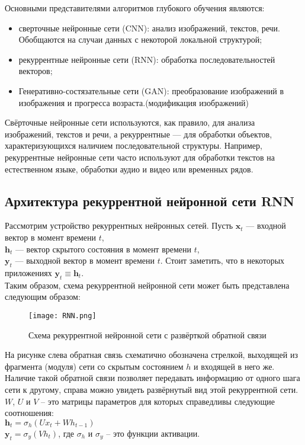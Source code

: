 \documentclass{article}
\begin{document}
	
	Основными представителями алгоритмов глубокого обучения являются:
	\begin{itemize}
		    \item сверточные нейронные сети (CNN): анализ изображений, текстов,
речи. Обобщаются на случаи данных с некоторой локальной
структурой;
    \item рекуррентные нейронные сети (RNN): обработка последовательностей
векторов;
\item Генеративно-состязательные сети (GAN): преобразование изображений в изображения и прогресса возраста.(модификация изображений)
	\end{itemize}
	
	Свёрточные нейронные сети используются, как правило, для анализа изображений, текстов и речи, а рекуррентные --- для обработки объектов, характеризующихся наличием последовательной структуры. Например, рекуррентные нейронные сети часто используют для обработки текстов на естественном языке, обработки аудио и видео или временных рядов.
	


\subsection{Архитектура рекуррентной нейронной сети RNN}
Рассмотрим устройство рекуррентных нейронных сетей. 
Пусть $\boldsymbol{x}_t$ — входной вектор в момент времени $t$,\\ $\boldsymbol{h}_t$ — вектор скрытого состояния в момент времени $t$,\\
$\boldsymbol{y}_t$ — выходной вектор в момент времени $t$. Стоит заметить, что в некоторых приложениях
$\boldsymbol{y}_t \equiv \boldsymbol{h}_t$. \\
Таким образом, схема рекуррентной нейронной сети может быть представлена следующим образом:
\begin{figure}[H]
	        \centering
	        \texttt{[image: RNN.png]}
	        \caption{Схема рекуррентной нейронной сети с развёрткой обратной связи}
	        \label{fig:my_label}
	    \end{figure}

На рисунке слева обратная связь схематично обозначена стрелкой, выходящей
из фрагмента (модуля) сети со скрытым состоянием $h$ и входящей в него же. Наличие такой обратной связи позволяет передавать информацию от одного шага сети к
другому, справа можно увидеть развёрнутый вид этой рекуррентной сети.
$W$, $U$ и $V$ -- это матрицы параметров для которых справедливы следующие соотношения:\\
$\boldsymbol{h}_t = \sigma_h(Ux_t + Wh_{t-1})$\\
$\boldsymbol{y}_t = \sigma_y (Vh_t) $, где $\sigma_h$ и $\sigma_y$ -- это функции активации.
\end{document}
